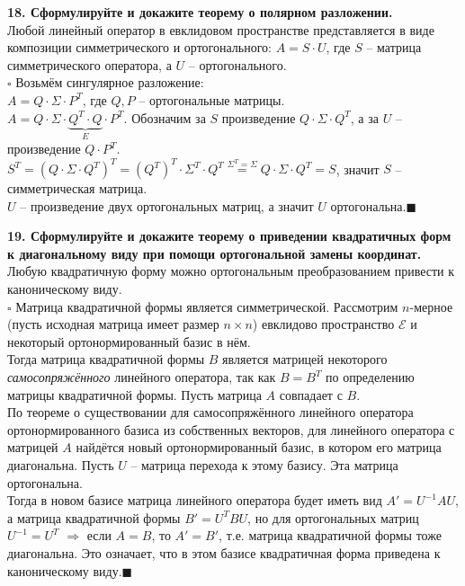 \documentclass[11pt,a4paper]{article}
\newcommand{\E}{\mathcal{E}}
\newcommand{\proof}{$\square$ }
\newcommand{\qed}{\hfill$\blacksquare$}
\begin{document}
\textbf{18. Сформулируйте и докажите теорему о полярном разложении.\\}
Любой линейный оператор в евклидовом пространстве представляется в виде композиции симметрического и ортогонального: $A = S \cdot U$, где $S$ -- матрица симметрического оператора, а $U$ -- ортогонального.\\
\proof Возьмём сингулярное разложение:\\
$A = Q \cdot \Sigma \cdot P^T$, где $Q, P$ -- ортогональные матрицы.\\
$A = Q \cdot \Sigma \cdot \underbrace{Q^T \cdot Q}_{E} \cdot P^T$. Обозначим за $S$ произведение $Q \cdot \Sigma \cdot Q^T$, а за $U$ -- произведение $Q \cdot P^T$.\\
$S^T = (Q \cdot \Sigma \cdot Q^T)^T = (Q^T)^T \cdot \Sigma^T \cdot Q^T \stackrel{\Sigma^T = \Sigma}{=} Q \cdot \Sigma \cdot Q^T = S$, значит $S$ -- симметрическая матрица.\\
$U$ -- произведение двух ортогональных матриц, а значит $U$ ортогональна.\qed

\textbf{19. Сформулируйте и докажите теорему о приведении квадратичных форм к диагональному виду при помощи ортогональной замены координат.\\}
Любую квадратичную форму можно ортогональным преобразованием привести к каноническому виду.\\
\proof Матрица квадратичной формы является симметрической. Рассмотрим $n$-мерное (пусть исходная матрица имеет размер $n \times n$) евклидово пространство $\E$ и некоторый ортонормированный базис в нём.\\
Тогда матрица квадратичной формы $B$ является матрицей некоторого \textit{самосопряжённого} линейного оператора, так как $B = B^T$ по определению матрицы квадратичной формы. Пусть матрица $A$ совпадает с $B$.\\
По теореме о существовании для самосопряжённого линейного оператора ортонормированного базиса из собственных векторов, для линейного оператора с матрицей $A$ найдётся новый ортонормированный базис, в котором его матрица диагональна. Пусть $U$ -- матрица перехода к этому базису. Эта матрица ортогональна.\\
Тогда в новом базисе матрица линейного оператора будет иметь вид $A' = U^{-1} A U$, а матрица квадратичной формы $B' = U^T B U$, но для ортогональных матриц $U^{-1} = U^T$ $\Rightarrow$ если $A = B$, то $A' = B'$, т.е. матрица квадратичной формы тоже диагональна. Это означает, что в этом базисе квадратичная форма приведена к каноническому виду.\qed
\end{document}
